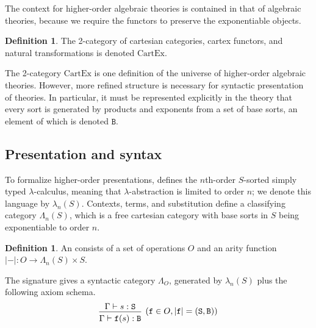 \documentclass[conference]{IEEEtran}
\theoremstyle{definition}
\newtheorem{definition}[theorem]{Definition}
\newcommand{\define}[1]{{\bf \boldmath{#1}}}
\newcommand{\mrm}[1]{\mathrm{#1}}
\newcommand{\mtt}[1]{\mathtt{#1}}
\newcommand{\CartEx}{\mrm{CartEx}}
\newcommand{\tts}{\mtt{S}}
\newcommand{\ttB}{\mtt{B}}
\newcommand{\ttf}{\mtt{f}}
\begin{document}
The context for higher-order algebraic theories is contained in that of algebraic theories, because we require the functors to preserve the exponentiable objects.

\begin{definition}
    The 2-category of cartesian categories, cartex functors, and natural transformations is denoted $\CartEx$. 
    
\end{definition}

The 2-category $\CartEx$ is one definition of the universe of higher-order algebraic theories. However, more refined structure is necessary for syntactic presentation of theories. In particular, it must be represented explicitly in the theory that every sort is generated by products and exponents from a set of base sorts, an element of which is denoted $\ttB$.

\subsection{Presentation and syntax}

To formalize higher-order presentations, \cite[A1]{hoat} defines the $n$th-order $S$-sorted simply typed $\lambda$-calculus, meaning that $\lambda$-abstraction is limited to order $n$; we denote this language by $\lambda_n(S)$. Contexts, terms, and substitution define a classifying category $\Lambda_n(S)$, which is a free cartesian category with base sorts in $S$ being exponentiable to order $n$.

\begin{definition}
    An \define{$n$th-order $S$-sorted signature} consists of a set of operations $O$ and an arity function $\lvert -\rvert:O\to \Lambda_n(S)\times S$.
    
    The signature gives a syntactic category $\Lambda_O$, generated by $\lambda_n(S)$ plus the following axiom schema.
    \[\begin{prooftree}
        \hypo{\Gamma \vdash s:\tts}
        \infer1[$(\ttf \in O, \lvert \ttf\rvert = (\tts,\ttB))$]{\Gamma \vdash \ttf(s):\ttB}
    \end{prooftree}\]
\end{definition}
\end{document}

